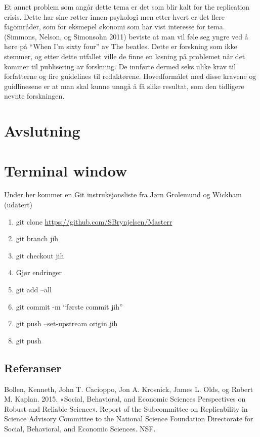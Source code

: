 \documentclass[
  12pt,
  norsk,
]{article}
\providecommand{\tightlist}{%
  \setlength{\itemsep}{0pt}\setlength{\parskip}{0pt}}
\begin{document}
Et annet problem som angår dette tema er det som blir kalt for the
replication crisis. Dette har sine røtter innen psykologi men etter
hvert er det flere fagområder, som for eksmepel økonomi som har vist
interesse for tema. (Simmons, Nelson, og Simonsohn 2011) beviste at man
vil føle seg yngre ved å høre på ``When I'm sixty four'' av The beatles.
Dette er forskning som ikke stemmer, og etter dette utfallet ville de
finne en løsning på problemet når det kommer til publisering av
forskning. De innførte dermed seks ulike krav til forfatterne og fire
guidelines til redaktørene. Hovedformålet med disse kravene og
guidlinesene er at man skal kunne unngå å få slike resultat, som den
tidligere nevnte forskningen.

\newpage

\hypertarget{avslutning}{%
\section{Avslutning}\label{avslutning}}

\hypertarget{terminal-window}{%
\section{Terminal window}\label{terminal-window}}

Under her kommer en Git instruksjonsliste fra Jørn Grolemund og Wickham
(udatert)

\begin{enumerate}
\def\labelenumi{\arabic{enumi}.}
\tightlist
\item
  git clone \url{https://github.com/SBrynjelsen/Masterr}
\item
  git branch jih
\item
  git checkout jih
\item
  Gjør endringer
\item
  git add --all
\item
  git commit -m ``første commit jih''
\item
  git push --set-upstream origin jih
\item
  git push
\end{enumerate}

\hypertarget{referanser}{%
\subsection{Referanser}\label{referanser}}

\hypertarget{refs}{}
\leavevmode\hypertarget{ref-bollen2015}{}%
Bollen, Kenneth, John T. Cacioppo, Jon A. Krosnick, James L. Olds, og
Robert M. Kaplan. 2015. «Social, Behavioral, and Economic Sciences
Perspectives on Robust and Reliable Science». Report of the Subcommittee
on Replicability in Science Advisory Committee to the National Science
Foundation Directorate for Social, Behavioral, and Economic Sciences.
NSF.
\end{document}

